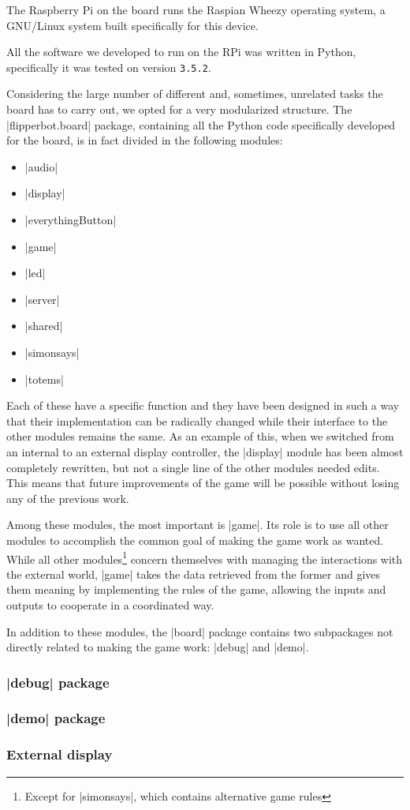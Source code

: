 The Raspberry Pi on the board runs the Raspian Wheezy operating system, a GNU/Linux
system built specifically for this device.

All the software we developed to run on the RPi was written in Python,
specifically it was tested on version \Verb|3.5.2|.

\beforelist* Considering the large number of different and, sometimes, unrelated
tasks the board has to carry out, we opted for a very modularized structure.
The \Code|flipperbot.board| package, containing all the Python code specifically
developed for the board, is in fact divided in the following modules:
\begin{multicols}{2}
\begin{itemize}
  \item \Code|audio|
  \item \Code|display|
  \item \Code|everythingButton|
  \item \Code|game|
  \item \Code|led|
  \item \Code|server|
  \item \Code|shared|
  \item \Code|simonsays|
  \item \Code|totems|
\end{itemize}
\end{multicols}
\afterlist*
Each of these have a specific function and they have been designed in such a way
that their implementation can be radically changed while their interface to the
other modules remains the same.
As an example of this, when we switched from an internal to an external display controller, the \Code|display| module has been almost completely rewritten, but
not a single line of the other modules needed edits.
This means that future improvements of the game will be possible without losing
any of the previous work.

Among these modules, the most important is \Code|game|.
Its role is to use all other modules to accomplish the common goal of making the
game work as wanted.
While all other modules\footnote{Except for \Code|simonsays|, which contains alternative game rules} concern themselves with managing the interactions with
the external world, \Code|game| takes the data retrieved from the former and
gives them meaning by implementing the rules of the game, allowing the inputs
and outputs to cooperate in a coordinated way.

In addition to these modules, the \Code|board| package contains two subpackages
not directly related to making the game work: \Code|debug| and \Code|demo|. 

\subsubsection[\code{demo} package]{\Code|debug| package}


\subsubsection[\code{demo} package]{\Code|demo| package}


\subsubsection{External display}

